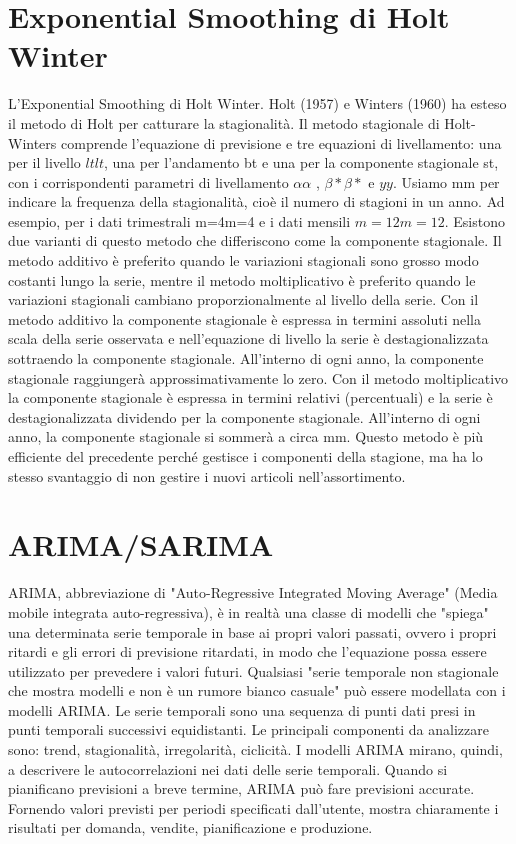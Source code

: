 \documentclass[12pt,a4paper]{report}
\begin{document}
\begin{appendices}
\section{Exponential Smoothing di Holt Winter}
\label{appendix:ETS}
L'Exponential Smoothing di Holt Winter. Holt (1957) e Winters (1960) ha esteso il metodo di Holt per catturare la stagionalità. Il metodo stagionale di Holt- Winters comprende l'equazione di previsione e tre equazioni di livellamento: una per il livello $ltlt$, una per l'andamento bt e una per la componente stagionale st, con i corrispondenti parametri di livellamento $\alpha\alpha$ , $\beta*\beta*$ e $y y$. Usiamo mm per indicare la frequenza della stagionalità, cioè il numero di stagioni in un anno. Ad esempio, per i dati trimestrali m=4m=4 e i dati mensili $m=12m=12$.
Esistono due varianti di questo metodo che differiscono come la componente stagionale. Il metodo additivo è preferito quando le variazioni stagionali sono grosso modo costanti lungo la serie, mentre il metodo moltiplicativo è preferito quando le variazioni stagionali cambiano proporzionalmente al livello della serie. Con il metodo additivo la componente stagionale è espressa in termini assoluti nella scala della serie osservata e nell'equazione di livello la serie è destagionalizzata sottraendo la componente stagionale. All'interno di ogni anno, la componente stagionale raggiungerà approssimativamente lo zero. Con il metodo moltiplicativo la componente stagionale è espressa in termini relativi (percentuali) e la serie è destagionalizzata dividendo per la componente stagionale. All'interno di ogni anno, la componente stagionale si sommerà a circa mm.
Questo metodo è più efficiente del precedente perché gestisce i componenti della stagione, ma ha lo stesso svantaggio di non gestire i nuovi articoli nell'assortimento.

\section{ARIMA/SARIMA}
\label{appendix:ARIMA}
ARIMA, abbreviazione di "Auto-Regressive Integrated Moving Average" (Media mobile integrata auto-regressiva), è in realtà una classe di modelli che "spiega" una determinata serie temporale in base ai propri valori passati, ovvero i propri ritardi e gli errori di previsione ritardati, in modo che l'equazione possa essere utilizzato per prevedere i valori futuri. Qualsiasi "serie temporale non stagionale che mostra modelli e non è un rumore bianco casuale" può essere modellata con i modelli ARIMA. Le serie temporali sono una sequenza di punti dati presi in punti temporali successivi equidistanti. Le principali componenti da analizzare sono: trend, stagionalità, irregolarità, ciclicità.
I modelli ARIMA mirano, quindi, a descrivere le autocorrelazioni nei dati delle serie temporali. Quando si pianificano previsioni a breve termine, ARIMA può fare previsioni accurate. Fornendo valori previsti per periodi specificati dall'utente, mostra chiaramente i risultati per domanda, vendite, pianificazione e produzione.


\end{appendices}
\end{document}
